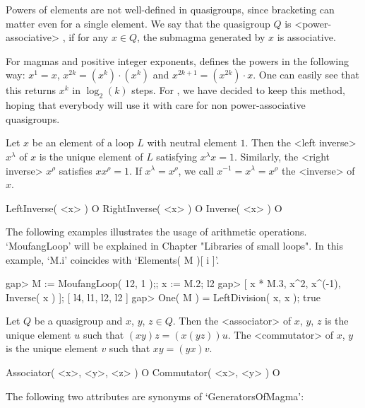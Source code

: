 
Powers of elements are not well-defined in quasigroups, since bracketing can
matter even for a single element. We say that the quasigroup $Q$ is
<power-associative>
%
%
, if for any $x\in Q$, the submagma generated by $x$ is
associative.

For magmas and positive integer exponents, {\GAP} defines the powers in the
following way: $x^1=x$, $x^{2k}=(x^k)\cdot(x^k)$ and $x^{2k+1}=(x^{2k})\cdot
x$. One can easily see that this returns $x^k$ in $\log_2(k)$ steps. For
{\LOOPS}, we have decided to keep this method, hoping that everybody will use
it with care for non power-associative quasigroups.

Let $x$ be an element of a loop $L$ with neutral element $1$. Then the
<left inverse>
%
%
 $x^\lambda$ of $x$ is the unique element of $L$ satisfying
$x^\lambda x=1$. Similarly, the <right inverse>
%
%
 $x^\rho$ satisfies
$xx^\rho=1$. If $x^\lambda=x^\rho$, we call $x^{-1}=x^\lambda=x^\rho$ the
<inverse>
%
%
 of $x$.

\>LeftInverse( <x> ) O
\>RightInverse( <x> ) O
\>Inverse( <x> ) O

The following examples illustrates the usage of arithmetic operations.
`MoufangLoop' will be explained in Chapter "Libraries of small loops". In this
example, `M.i' coincides with `Elements( M )[ i ]'.

\beginexample
gap> M := MoufangLoop( 12, 1 );; x := M.2;
l2
gap> [ x * M.3, x^2, x^(-1), Inverse( x ) ];
[ l4, l1, l2, l2 ]
gap> One( M ) = LeftDivision( x, x );
true
\endexample


Let $Q$ be a quasigroup and $x$, $y$, $z\in Q$. Then the <associator>
%
%
 of
$x$, $y$, $z$ is the unique element $u$ such that $(xy)z=(x(yz))u$. The
<commutator>
%
%
 of $x$, $y$ is the unique element $v$ such that $xy=(yx)v$.

\>Associator( <x>, <y>, <z> ) O
\>Commutator( <x>, <y> ) O


The following two attributes are synonyms of `GeneratorsOfMagma':

